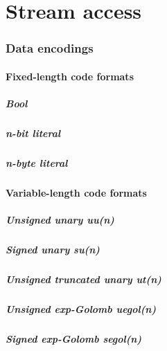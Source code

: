 \part{Stream access}

\section{Data encodings}
\subsection{Fixed-length code formats}
\subsubsection{Bool}
\subsubsection{n-bit literal}
\subsubsection{n-byte literal}
\subsection{Variable-length code formats}
\subsubsection{Unsigned unary uu(n)}
\subsubsection{Signed unary su(n)}
\subsubsection{Unsigned truncated unary ut(n)}
\subsubsection{Unsigned exp-Golomb uegol(n)}
\subsubsection{Signed exp-Golomb segol(n)}

